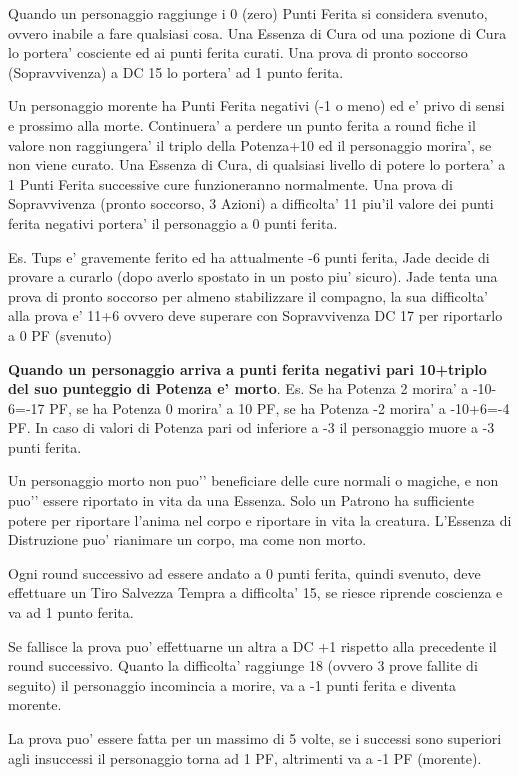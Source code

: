 \documentclass[a4paper,11pt,twoside,openany]{book}
\begin{document}
	Quando un personaggio raggiunge i 0 (zero) Punti Ferita si considera svenuto, ovvero inabile a fare qualsiasi cosa. Una Essenza di Cura od una pozione di Cura lo portera’ cosciente ed ai punti ferita curati. Una prova di pronto soccorso (Sopravvivenza) a DC 15 lo portera’ ad 1 punto ferita.
	
	Un personaggio morente ha Punti Ferita negativi (-1 o meno) ed e' privo di sensi e prossimo alla morte. Continuera’ a perdere un punto ferita a round fiche il valore non raggiungera’ il triplo della Potenza+10 ed il personaggio morira’, se non viene curato.
	Una Essenza di Cura, di qualsiasi livello di potere lo portera’ a 1 Punti Ferita successive cure funzioneranno normalmente.
	Una prova di Sopravvivenza (pronto soccorso, 3 Azioni) a difficolta’ 11 piu’il valore dei punti ferita negativi portera’ il personaggio a 0 punti ferita.
	
	Es. Tups e’ gravemente ferito ed ha attualmente -6 punti ferita, Jade decide di provare a curarlo (dopo averlo spostato in un posto piu’ sicuro). Jade tenta una prova di pronto soccorso per almeno stabilizzare il compagno, la sua difficolta’ alla prova e’ 11+6 ovvero deve superare con Sopravvivenza DC 17 per riportarlo a 0 PF (svenuto)
	
	\textbf{Quando un personaggio arriva a punti ferita negativi pari 10+triplo del suo punteggio di Potenza e’ morto}. Es. Se ha Potenza 2 morira’ a -10-6=-17 PF, se ha Potenza 0 morira’ a 10 PF, se ha Potenza -2 morira’ a -10+6=-4 PF. In caso di valori di Potenza pari od inferiore a -3 il personaggio muore a -3 punti ferita.
	
	\bigskip
	
	Un personaggio morto non puo'’ beneficiare delle cure normali o magiche, e non puo'’ essere riportato in vita da una Essenza. Solo un Patrono ha sufficiente potere per riportare l’anima nel corpo e riportare in vita la creatura. L’Essenza di Distruzione puo' rianimare un corpo, ma come non morto.
	
	Ogni round successivo ad essere andato a 0 punti ferita, quindi svenuto, deve effettuare un Tiro Salvezza Tempra a difficolta’ 15, se riesce riprende coscienza e va ad 1 punto ferita.
	
	Se fallisce la prova puo’ effettuarne un altra a DC +1 rispetto alla precedente il round successivo. Quanto la difficolta’ raggiunge 18 (ovvero 3 prove fallite di seguito) il personaggio incomincia a morire, va a -1 punti ferita e diventa morente.
	
	La prova puo’ essere fatta per un massimo di 5 volte, se i successi sono superiori agli insuccessi il personaggio torna ad 1 PF, altrimenti va a -1 PF (morente).
	
\end{document}
